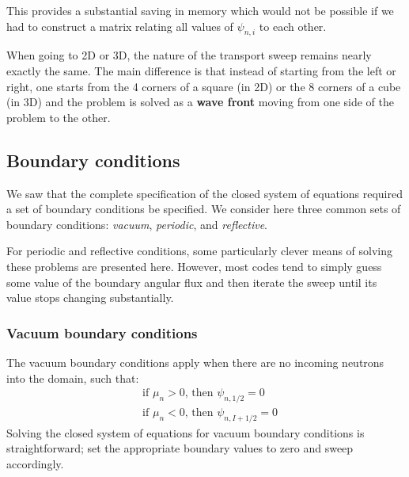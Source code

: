 \documentclass{article}
\begin{document}
This provides a substantial saving in memory which would not be possible if we had to construct a matrix relating all values of $\psi_{n,i}$ to each other.

When going to 2D or 3D, the nature of the transport sweep remains nearly exactly the same. The main difference is that instead of starting from the left or right, one starts from the 4 corners of a square (in 2D) or the 8 corners of a cube (in 3D) and the problem is solved as a \textbf{wave front} moving from one side of the problem to the other.

\subsection{Boundary conditions}
We saw that the complete specification of the closed system of equations required a set of boundary conditions be specified. We consider here three common sets of boundary conditions: \textit{vacuum}, \textit{periodic}, and \textit{reflective}. 

For periodic and reflective conditions, some particularly clever means of solving these problems are presented here. However, most codes tend to simply guess some value of the boundary angular flux and then iterate the sweep until its value stops changing substantially.

\subsubsection{Vacuum boundary conditions}
The vacuum boundary conditions apply when there are no incoming neutrons into the domain, such that:
\begin{align}
    &\text{if }\mu_n>0\text{, then }\psi_{n,1/2}=0\\
    &\text{if }\mu_n<0\text{, then }\psi_{n,I+1/2}=0
\end{align}
Solving the closed system of equations for vacuum boundary conditions is straightforward; set the appropriate boundary values to zero and sweep accordingly.
\end{document}
